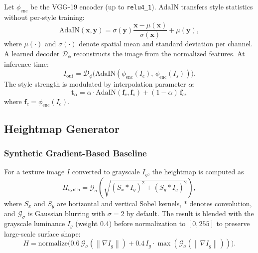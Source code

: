 \documentclass[conference]{IEEEtran}
\newcommand{\norm}[1]{\left\lVert#1\right\rVert}
\begin{document}
Let $\phi_{\text{enc}}$ be the VGG-19 encoder (up to \texttt{relu4\_1}).
AdaIN transfers style statistics without per-style training:
\begin{equation}
  \mathrm{AdaIN}(\mathbf{x},\mathbf{y}) =
    \sigma(\mathbf{y})\frac{\mathbf{x}-\mu(\mathbf{x})}{\sigma(\mathbf{x})}
    + \mu(\mathbf{y}),
  \label{eq:adain}
\end{equation}
where $\mu(\cdot)$ and $\sigma(\cdot)$ denote spatial mean and standard
deviation per channel. A learned decoder $\mathcal{D}_\phi$ reconstructs
the image from the normalized features. At inference time:
\begin{equation}
  I_{\text{out}} = \mathcal{D}_\phi\bigl(\mathrm{AdaIN}(\phi_{\text{enc}}(I_c),\,
    \phi_{\text{enc}}(I_s))\bigr).
  \label{eq:adain_inference}
\end{equation}
The style strength is modulated by interpolation parameter $\alpha$:
\begin{equation}
  \mathbf{t}_\alpha = \alpha\cdot\mathrm{AdaIN}(\mathbf{f}_c,\mathbf{f}_s)
    + (1-\alpha)\,\mathbf{f}_c,
  \label{eq:adain_alpha}
\end{equation}
where $\mathbf{f}_c = \phi_{\text{enc}}(I_c)$.

\subsection{Heightmap Generator}
\label{sec:hm}

\subsubsection{Synthetic Gradient-Based Baseline}

For a texture image $I$ converted to grayscale $I_g$, the heightmap is
computed as
\begin{equation}
  H_{\text{synth}} = \mathcal{G}_\sigma\!\left(
    \sqrt{(S_x * I_g)^2 + (S_y * I_g)^2}\right),
  \label{eq:synthetic}
\end{equation}
where $S_x$ and $S_y$ are horizontal and vertical Sobel kernels,
$*$ denotes convolution, and $\mathcal{G}_\sigma$ is Gaussian blurring
with $\sigma=2$ by default. The result is blended with the grayscale
luminance $I_g$ (weight 0.4) before normalization to $[0,255]$ to
preserve large-scale surface shape:
\begin{equation}
  H = \mathrm{normalize}\bigl(0.6\,\mathcal{G}_\sigma(\norm{\nabla I_g})
    + 0.4\,I_g\cdot\max(\mathcal{G}_\sigma(\norm{\nabla I_g}))\bigr).
  \label{eq:synthetic_blend}
\end{equation}
\end{document}
